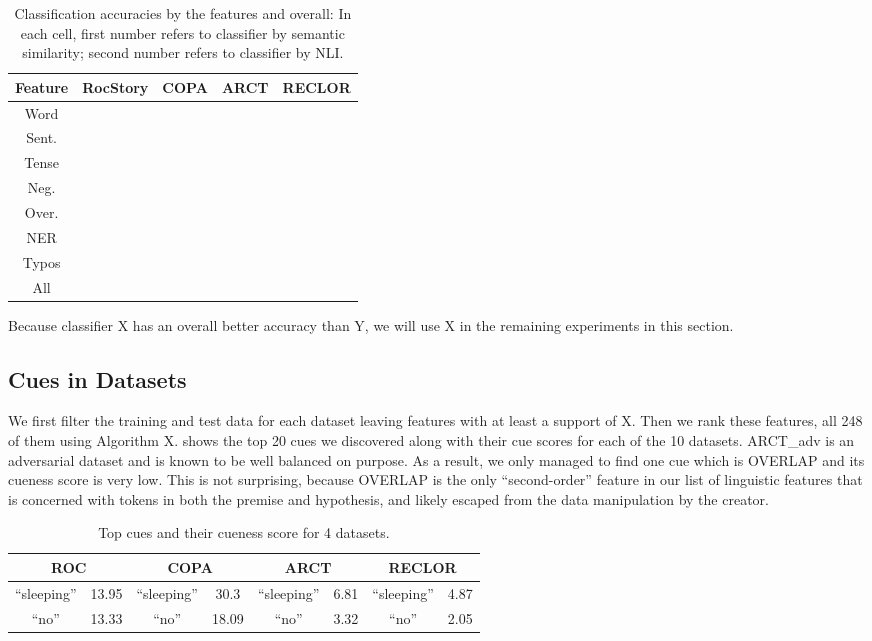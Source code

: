 \begin{table}[ht!]
\centering
\begin{tabular}{|c|r|r|r|r|} 
\hline 
Feature & RocStory & COPA & ARCT & RECLOR \\ \hline \hline
Word &	& 	&	&  \\ \hline
Sent.&	& 	&	&  \\ \hline
Tense &	& 	&	&  \\ \hline
Neg. &	& 	&	&  \\ \hline
Over.&	& 	&	&  \\ \hline
NER&	& 	&	&  \\ \hline
Typos &	& 	&	&  \\ \hline
All &	& 	&	&  \\ \hline
\end{tabular}
\caption{Classification accuracies by the features and overall: In each cell,
first number refers to classifier by semantic similarity; second number
refers to classifier by NLI.}
\label{tab:extra}
\end{table}

Because classifier X has an overall better accuracy than Y, we will use X in the 
remaining experiments in this section.

\subsection{Cues in Datasets}

We first filter the training and test data for each dataset leaving features with
at least a support of X. Then we rank these features, all 248 of them using Algorithm X.
 shows the top 20 cues we discovered along with their cue scores
for each of the 10 datasets. ARCT\_adv is an adversarial dataset
and is known to be well balanced on purpose. As a result, we only managed to find one cue
which is OVERLAP and its cueness score is very low. This is not surprising, because
OVERLAP is the only ``second-order'' feature in our list of linguistic features that
is concerned with tokens in both the premise and hypothesis, and likely escaped from
the data manipulation by the creator. 

\begin{table}[th]
\centering
\scriptsize
\begin{tabular}{|cc|cc|cc|cc|} \hline
\multicolumn{2}{|c|}{ROC} & \multicolumn{2}{c|}{COPA}& \multicolumn{2}{c|}{ARCT} & \multicolumn{2}{c|}{RECLOR} \\ \hline 
 ``sleeping'' & 13.95 & ``sleeping'' & 30.3 & ``sleeping'' & 6.81 & ``sleeping'' & 4.87 \\\hline           
 ``no'' & 13.33 & ``no'' & 18.09 &``no'' &3.32 & ``no'' & 2.05 \\
\hline 
\end{tabular}
\caption{Top cues and their cueness score for 4 datasets.}\label{tab:bias}
\end{table}

